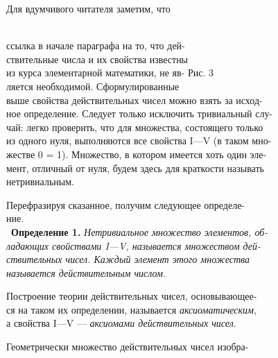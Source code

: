 \documentclass{article}
\begin{document}
{\small Для вдумчивого читателя заметим, что \hspace{5pt}
 \\
ссылка в начале параграфа на то, что дей- \\
ствительные числа и их свойства известны  \\
из курса элементарной математики, не яв- \hspace{30pt} Рис. 3 \\
ляется необходимой. Сформулированные \\
выше свойства действительных чисел можно взять за исход- \\
ное определение. Следует только исключить тривиальный слу- \\
чай: легко проверить, что для множества, состоящего только \\
из одного нуля, выполняются все свойства I—V (в таком мно- \\
жестве 0 = 1). Множество, в котором имеется хоть один эле- \\
мент, отличный от нуля, будем здесь для краткости называть \\
нетривиальным. \par
Перефразируя сказанное, получим следующее определе- \\
ние. \\
\
\textbf{Определение 1.} \textit{Нетривиальное множество элементов, об- \\
ладающих свойствами I—V, называется множеством дей- \\
ствительных чисел. Каждый элемент этого множества \\
называется действительным числом.} \par
Построение теории действительных чисел, основывающее- \\
ся на таком их определении, называется \textit{аксиоматическим}, \\
а свойства I—V — \textit{аксиомами действительных чисел}. \par
Геометрически множество действительных чисел изобра- \\
}
\end{document}
